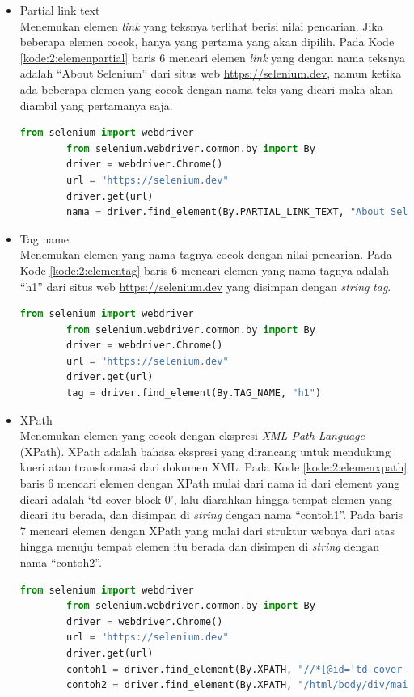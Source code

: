 \begin{itemize}
	\item Partial link text\\
	Menemukan elemen \textit{link} yang teksnya terlihat berisi nilai pencarian. Jika beberapa elemen cocok, hanya yang pertama yang akan dipilih. Pada Kode \ref{kode:2:elemenpartial} baris 6 mencari elemen \textit{link} yang dengan nama teksnya adalah ``About Selenium'' dari situs web \url{https://selenium.dev}, namun ketika ada beberapa elemen yang cocok dengan nama teks yang dicari maka akan diambil yang pertamanya saja.
	\begin{lstlisting}[language=python, caption=Contoh kode untuk menemukan elemen dengan \textit{partial link text}, label=kode:2:elemenpartial]
		from selenium import webdriver
		from selenium.webdriver.common.by import By
		driver = webdriver.Chrome()
		url = "https://selenium.dev"
		driver.get(url)
		nama = driver.find_element(By.PARTIAL_LINK_TEXT, "About Selenium")
	\end{lstlisting}
	
	\item Tag name\\
	Menemukan elemen yang nama tagnya cocok dengan nilai pencarian. Pada Kode \ref{kode:2:elementag} baris 6 mencari elemen yang nama tagnya adalah ``h1'' dari situs web \url{https://selenium.dev} yang disimpan dengan \textit{string} \textit{tag}.
	\begin{lstlisting}[language=python, caption=Contoh kode untuk menemukan elemen dengan \textit{tag name}, label=kode:2:elementag]
		from selenium import webdriver
		from selenium.webdriver.common.by import By
		driver = webdriver.Chrome()
		url = "https://selenium.dev"
		driver.get(url)
		tag = driver.find_element(By.TAG_NAME, "h1")
	\end{lstlisting}
	
	\item XPath\\
	Menemukan elemen yang cocok dengan ekspresi \textit{XML Path Language} (XPath). XPath adalah bahasa ekspresi yang dirancang untuk mendukung kueri atau transformasi dari dokumen XML\cite{xpath}. Pada Kode \ref{kode:2:elemenxpath} baris 6 mencari elemen dengan XPath mulai dari nama id dari element yang dicari adalah `td-cover-block-0', lalu diarahkan hingga tempat elemen yang dicari itu berada, dan disimpan di \textit{string} dengan nama ``contoh1''. Pada baris 7 mencari elemen dengan XPath yang mulai dari struktur webnya dari atas hingga menuju tempat elemen itu berada dan disimpen di \textit{string} dengan nama ``contoh2''.
	\begin{lstlisting}[language=python, caption=Contoh kode untuk menemukan elemen dengan ekspresi XPath, label=kode:2:elemenxpath]
		from selenium import webdriver
		from selenium.webdriver.common.by import By
		driver = webdriver.Chrome()
		url = "https://selenium.dev"
		driver.get(url)
		contoh1 = driver.find_element(By.XPATH, "//*[@id='td-cover-block-0']/div/div/div/div/h1")
		contoh2 = driver.find_element(By.XPATH, "/html/body/div/main/section[1]/div/div/div/div/h1")
	\end{lstlisting}
\end{itemize}

